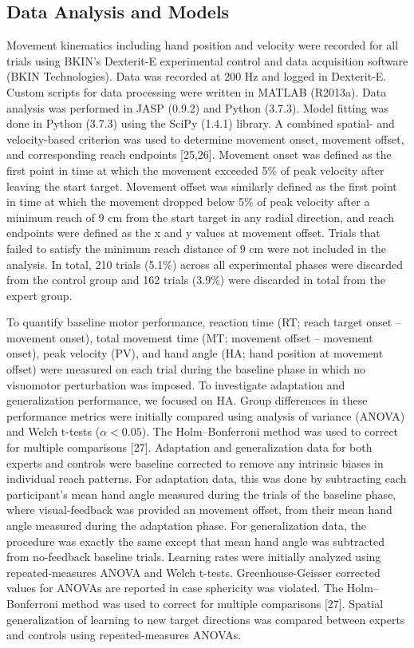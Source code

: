 \documentclass[jou, apacite, 11pt, longtable, floatsintext, notab]{apa6}
\begin{document}
\subsection{Data Analysis and Models}
Movement kinematics including hand position and velocity
were recorded for all trials using BKIN’s Dexterit-E
experimental control and data acquisition software (BKIN
Technologies). Data was recorded at 200 Hz and logged in
Dexterit-E. Custom scripts for data processing were written
in MATLAB (R2013a). Data analysis was performed in JASP
(0.9.2) and Python (3.7.3). Model fitting was done in Python
(3.7.3) using the SciPy (1.4.1) library. A combined spatial-
and velocity-based criterion was used to determine movement
onset, movement offset, and corresponding reach endpoints
[25,26]. Movement onset was defined as the first point in
time at which the movement exceeded 5\% of peak velocity
after leaving the start target. Movement offset was
similarly defined as the first point in time at which the
movement dropped below 5\% of peak velocity after a minimum
reach of 9 cm from the start target in any radial direction,
and reach endpoints were defined as the x and y values at
movement offset. Trials that failed to satisfy the minimum
reach distance of 9 cm were not included in the analysis. In
total, 210 trials (5.1\%) across all experimental phases
were discarded from the control group and 162 trials (3.9\%)
were discarded in total from the expert group.

To quantify baseline motor performance, reaction time (RT;
reach target onset – movement onset), total movement time
(MT; movement offset – movement onset), peak velocity (PV),
and hand angle (HA; hand position at movement offset) were
measured on each trial during the baseline phase in which no
visuomotor perturbation was imposed. To investigate
adaptation and generalization performance, we focused on HA.
Group differences in these performance metrics were
initially compared using analysis of variance (ANOVA) and
Welch t-tests ($\alpha < 0.05$). The Holm–Bonferroni method was
used to correct for multiple comparisons
[27].
Adaptation
and generalization data for both experts and controls were
baseline corrected to remove any intrinsic biases in
individual reach patterns. For adaptation data, this was
done by subtracting each participant’s mean hand angle
measured during the trials of the baseline phase, where
visual-feedback was provided an movement offset, from their
mean hand angle measured during the adaptation phase. For
generalization data, the procedure was exactly the same
except that mean hand angle was subtracted from no-feedback
baseline trials. Learning rates were initially analyzed
using repeated-measures ANOVA and Welch t-tests.
Greenhouse-Geisser corrected values for ANOVAs are reported
in case sphericity was violated. The Holm–Bonferroni method
was used to correct for multiple comparisons
[27].
Spatial
generalization of learning to new target directions was
compared between experts and controls using
repeated-measures ANOVAs.
\end{document}
